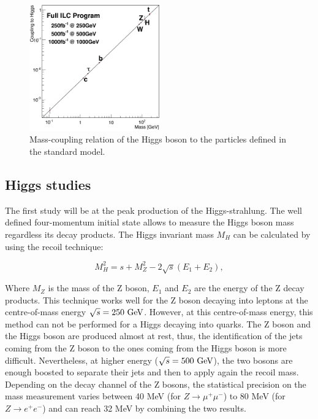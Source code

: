     \begin{figure}[!h]
      \centering
      \includegraphics[width = 0.5\textwidth]{Pictures/Higgs/Chapter_Theory_figs_mass-coupling1TeV.png}
      \caption{Mass-coupling relation of the Higgs boson to the particles defined in the standard model\cite{tian}.}
      \label{fig:coupling}
    \end{figure}

    \subsection{Higgs studies}

    The first study will be at the peak production of the Higgs-strahlung. 
    The well defined four-momentum initial state allows to measure the Higgs boson mass regardless its decay products.
    The Higgs invariant mass $M_H$ can be calculated by using the recoil technique:

    \begin{equation}
      M^2_H = s + M^2_Z - 2 \sqrt{s}\left(E_{1} + E_{2}\right),
    \end{equation}

    Where $M_Z$ is the mass of the Z boson, $E_1$ and $E_2$ are the energy of the Z decay products. 
    This technique works well for the Z boson decaying into leptons at the centre-of-mass energy $\sqrt{s} = 250~\rm{GeV}$.
    However, at this centre-of-mass energy, this method can not be performed for a Higgs decaying into quarks. 
    The Z boson and the Higgs boson are produced almost at rest, thus, the identification of the jets coming from the Z boson to the ones coming from the Higgs boson is more difficult.
    Nevertheless, at higher energy ($\sqrt{s} = 500~\rm{GeV}$), the two bosons are enough boosted to separate their jets and then to apply again the recoil mass.
    Depending on the decay channel of the Z bosons, the statistical precision on the mass measurement varies between 40 MeV (for $Z \rightarrow \mu^+\mu^-$) to 80 MeV (for $Z \rightarrow e^+e^-$) and can reach 32 MeV by combining the two results.

